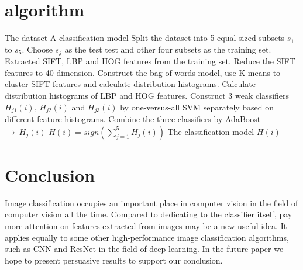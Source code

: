 \documentclass[conference]{IEEEtran}
\begin{document}
\section{algorithm}
\begin{algorithm}
			
			\begin{algorithmic}[1]
			\REQUIRE The dataset 
			\ENSURE A classification model
			\STATE Split the dataset into 5 equal-sized subsets $s_1$ to $s_5$.
			\STATE Choose $s_j$ as the test test and other four subsets as the training set.
			\STATE Extracted SIFT, LBP and HOG features from the training set.
			\STATE Reduce the SIFT features to 40 dimension.
			\STATE Construct the bag of words model, use K-means to cluster SIFT features and calculate distribution histograms.
			\STATE Calculate distribution histograms of LBP and HOG features.
			\STATE Construct 3 weak classifiers $H_{j1}(i)$, $H_{j2}(i)$ and $H_{j3}(i)$ by one-versus-all SVM separately based on different feature histograms.
			\STATE Combine the three classifiers by AdaBoost $\rightarrow\ H_j(i)$ 
			\ENDFOR
			\STATE $H(i) = sign(\sum\limits_{j = 1}^{5}H_j(i))$
			\RETURN The classification model $H(i)$
			\end{algorithmic}
			\end{algorithm}
	


\section{Conclusion} 
Image classification occupies an important place in computer vision in the field of computer vision all the time. Compared to dedicating to the classifier itself, pay more attention on features extracted from images may be a new useful idea. It applies equally to some other high-performance image classification algorithms, such as CNN and ResNet in the field of deep learning.
In the future paper we hope to present persuasive results to support our conclusion.
\end{document}
